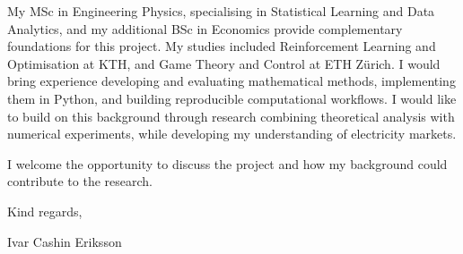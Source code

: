 \documentclass[11pt,a4paper]{moderncv}
\begin{document}
\vspace{4pt}
\hspace*{2em}
My MSc in Engineering Physics, specialising in Statistical Learning and Data Analytics, and my additional BSc in Economics provide complementary foundations for this project. My studies included Reinforcement Learning and Optimisation at KTH, and Game Theory and Control at ETH Zürich. I would bring experience developing and evaluating mathematical methods, implementing them in Python, and building reproducible computational workflows. I would like to build on this background through research combining theoretical analysis with numerical experiments, while developing my understanding of electricity markets.

\vspace*{2em}
I welcome the opportunity to discuss the project and how my background could contribute to the research.

\vspace{2em}
Kind regards,

Ivar Cashin Eriksson
\end{document}
